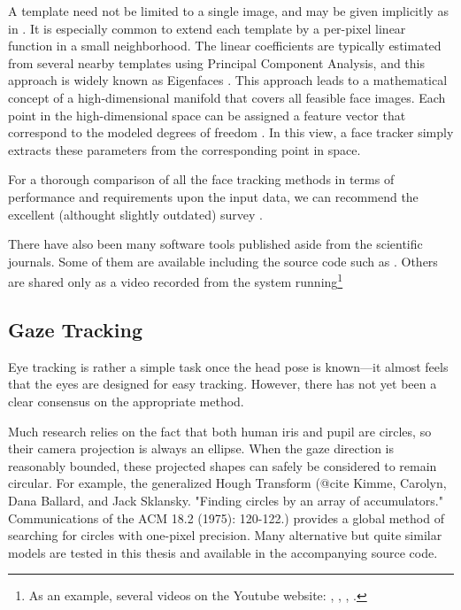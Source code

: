 A template need not be limited to a single image, and may be given implicitly as in \cite{gourier06}.
It is especially common to extend each template by a per-pixel linear function in a small neighborhood.
The linear coefficients are typically estimated from several nearby templates using Principal Component Analysis, and this approach is widely known as Eigenfaces \cite{srinivasan02,morency03}.
This approach leads to a mathematical concept of a high-dimensional manifold that covers all feasible face images.
Each point in the high-dimensional space can be assigned a feature vector that correspond to the modeled degrees of freedom \cite{balasubramanian07}.
In this view, a face tracker simply extracts these parameters from the corresponding point in space.




For a thorough comparison of all the face tracking methods in terms of performance and requirements upon the input data, we can recommend the excellent (althought slightly outdated) survey \cite{murphy-chutorian09}.

There have also been many software tools published aside from the scientific journals.
Some of them are available including the source code such as .
Others are shared only as a video recorded from the system running\footnote{
As an example, several videos on the Youtube website:
,
,
 ,
.
}

\subsection{Gaze Tracking}

Eye tracking is rather a simple task once the head pose is known---it almost feels that the eyes are designed for easy tracking.
However, there has not yet been a clear consensus on the appropriate method.

Much research relies on the fact that both human iris and pupil are circles, so their camera projection is always an ellipse.
When the gaze direction is reasonably bounded, these projected shapes can safely be considered to remain circular.
For example, the generalized Hough Transform (@cite Kimme, Carolyn, Dana Ballard, and Jack Sklansky. "Finding circles by an array of accumulators." Communications of the ACM 18.2 (1975): 120-122.) provides a global method of searching for circles with one-pixel precision.
Many alternative but quite similar models are tested in this thesis and available in the accompanying source code.

